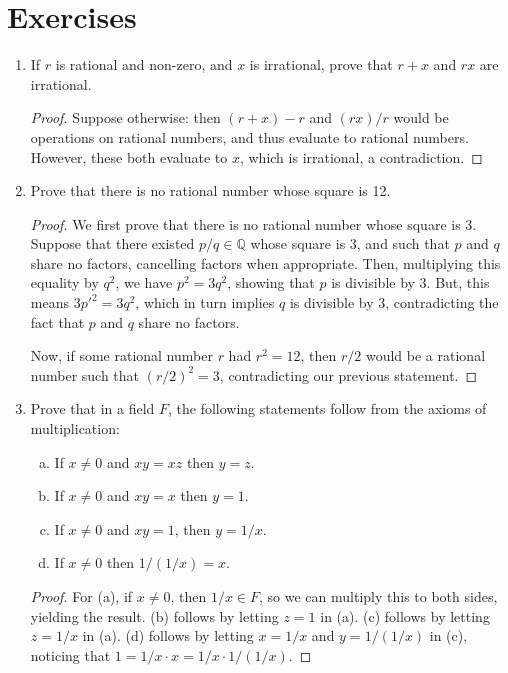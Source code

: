 \documentclass{scrbook}
\newcommand{\Q}{\mathbb{Q}}
\begin{document}
\section{Exercises}
\begin{enumerate}
\item If $r$ is rational and non-zero, and $x$ is irrational, prove that $r + x$ and $rx$ are irrational.

\begin{proof}
Suppose otherwise: then $(r + x) - r$ and $(rx) / r$ would be operations on rational numbers, and thus evaluate to rational numbers. However, these both evaluate to $x$, which is irrational, a contradiction.
\end{proof}

\item Prove that there is no rational number whose square is 12.

\begin{proof}
We first prove that there is no rational number whose square is 3. Suppose that there existed $p / q \in \Q$ whose square is 3, and such that $p$ and $q$ share no factors, cancelling factors when appropriate. Then, multiplying this equality by $q^2$, we have $p^2 = 3q^2$, showing that $p$ is divisible by 3. But, this means $3p'^2 = 3q^2$, which in turn implies $q$ is divisible by 3, contradicting the fact that $p$ and $q$ share no factors.

Now, if some rational number $r$ had $r^2 = 12$, then $r/2$ would be a rational number such that $(r/2)^2 = 3$, contradicting our previous statement.
\end{proof}

\item Prove that in a field $F$, the following statements follow from the axioms of multiplication:
\begin{enumerate}[(a)]
\item If $x \ne 0$ and $xy = xz$ then $y = z$.
\item If $x \ne 0$ and $xy = x$ then $y = 1$.
\item If $x \ne 0$ and $xy = 1$, then $y = 1/x$.
\item If $x \ne 0$ then $1/(1/x) = x$.
\end{enumerate}
\begin{proof}
For (a), if $x \ne 0$, then $1/x \in F$, so we can multiply this to both sides, yielding the result. (b) follows by letting $z = 1$ in (a). (c) follows by letting $z = 1/x$ in (a). (d) follows by letting $x = 1/x$ and $y = 1/(1/x)$ in (c), noticing that $1 = 1/x \cdot x = 1/x \cdot 1/(1/x)$.
\end{proof}


\end{enumerate}
\end{document}
